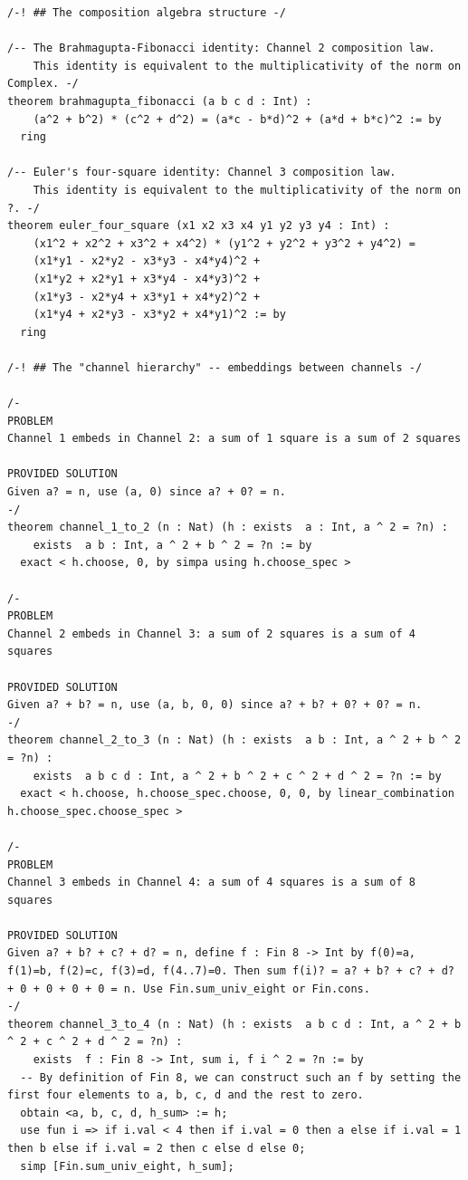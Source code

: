 \documentclass[11pt,twoside,openright]{book}
\theoremstyle{definition}
\theoremstyle{remark}
\begin{document}
\begin{lstlisting}[style=lean]
/-! ## The composition algebra structure -/

/-- The Brahmagupta-Fibonacci identity: Channel 2 composition law.
    This identity is equivalent to the multiplicativity of the norm on Complex. -/
theorem brahmagupta_fibonacci (a b c d : Int) :
    (a^2 + b^2) * (c^2 + d^2) = (a*c - b*d)^2 + (a*d + b*c)^2 := by
  ring

/-- Euler's four-square identity: Channel 3 composition law.
    This identity is equivalent to the multiplicativity of the norm on ?. -/
theorem euler_four_square (x1 x2 x3 x4 y1 y2 y3 y4 : Int) :
    (x1^2 + x2^2 + x3^2 + x4^2) * (y1^2 + y2^2 + y3^2 + y4^2) =
    (x1*y1 - x2*y2 - x3*y3 - x4*y4)^2 +
    (x1*y2 + x2*y1 + x3*y4 - x4*y3)^2 +
    (x1*y3 - x2*y4 + x3*y1 + x4*y2)^2 +
    (x1*y4 + x2*y3 - x3*y2 + x4*y1)^2 := by
  ring

/-! ## The "channel hierarchy" -- embeddings between channels -/

/-
PROBLEM
Channel 1 embeds in Channel 2: a sum of 1 square is a sum of 2 squares

PROVIDED SOLUTION
Given a? = n, use (a, 0) since a? + 0? = n.
-/
theorem channel_1_to_2 (n : Nat) (h : exists  a : Int, a ^ 2 = ?n) :
    exists  a b : Int, a ^ 2 + b ^ 2 = ?n := by
  exact < h.choose, 0, by simpa using h.choose_spec >

/-
PROBLEM
Channel 2 embeds in Channel 3: a sum of 2 squares is a sum of 4 squares

PROVIDED SOLUTION
Given a? + b? = n, use (a, b, 0, 0) since a? + b? + 0? + 0? = n.
-/
theorem channel_2_to_3 (n : Nat) (h : exists  a b : Int, a ^ 2 + b ^ 2 = ?n) :
    exists  a b c d : Int, a ^ 2 + b ^ 2 + c ^ 2 + d ^ 2 = ?n := by
  exact < h.choose, h.choose_spec.choose, 0, 0, by linear_combination h.choose_spec.choose_spec >

/-
PROBLEM
Channel 3 embeds in Channel 4: a sum of 4 squares is a sum of 8 squares

PROVIDED SOLUTION
Given a? + b? + c? + d? = n, define f : Fin 8 -> Int by f(0)=a, f(1)=b, f(2)=c, f(3)=d, f(4..7)=0. Then sum f(i)? = a? + b? + c? + d? + 0 + 0 + 0 + 0 = n. Use Fin.sum_univ_eight or Fin.cons.
-/
theorem channel_3_to_4 (n : Nat) (h : exists  a b c d : Int, a ^ 2 + b ^ 2 + c ^ 2 + d ^ 2 = ?n) :
    exists  f : Fin 8 -> Int, sum i, f i ^ 2 = ?n := by
  -- By definition of Fin 8, we can construct such an f by setting the first four elements to a, b, c, d and the rest to zero.
  obtain <a, b, c, d, h_sum> := h;
  use fun i => if i.val < 4 then if i.val = 0 then a else if i.val = 1 then b else if i.val = 2 then c else d else 0;
  simp [Fin.sum_univ_eight, h_sum];


\end{lstlisting}
\end{document}

